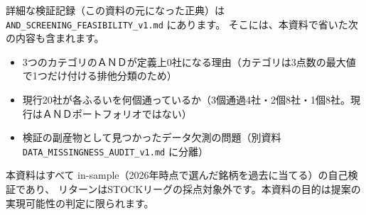 \documentclass[a4paper,10.5pt]{article}
\begin{document}
詳細な検証記録（この資料の元になった正典）は
\texttt{AND\_SCREENING\_FEASIBILITY\_v1.md} にあります。
そこには、本資料で省いた次の内容も含まれます。

\begin{itemize}[leftmargin=1.4em,itemsep=1pt,topsep=2pt]
\item 3つのカテゴリのＡＮＤが定義上0社になる理由（カテゴリは3点数の最大値で1つだけ付ける排他分類のため）
\item 現行20社が各ふるいを何個通っているか（3個通過4社・2個8社・1個8社。現行はＡＮＤポートフォリオではない）
\item 検証の副産物として見つかったデータ欠測の問題（別資料 \texttt{DATA\_MISSINGNESS\_AUDIT\_v1.md} に分離）
\end{itemize}

\vspace{6pt}
{\footnotesize\color{gray}
本資料はすべて in-sample（2026年時点で選んだ銘柄を過去に当てる）の自己検証であり、
リターンはSTOCKリーグの採点対象外です。本資料の目的は提案の実現可能性の判定に限られます。\par}
\end{document}
